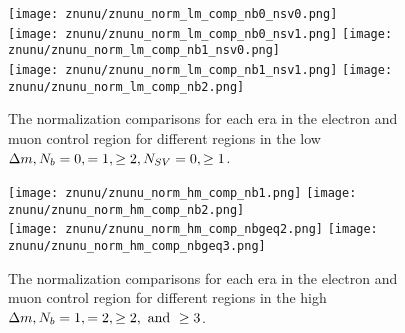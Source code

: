 \begin{figure}[!h]
	\begin{center}
  \texttt{[image: znunu/znunu\_norm\_lm\_comp\_nb0\_nsv0.png]} \\
  \texttt{[image: znunu/znunu\_norm\_lm\_comp\_nb0\_nsv1.png]} 
  \texttt{[image: znunu/znunu\_norm\_lm\_comp\_nb1\_nsv0.png]} \\
  \texttt{[image: znunu/znunu\_norm\_lm\_comp\_nb1\_nsv1.png]} 
  \texttt{[image: znunu/znunu\_norm\_lm\_comp\_nb2.png]} \\

	\end{center}
	\caption[\Znunu{} Normalization Low \dm{} Comparisons]{The \Znunu{} normalization comparisons for each era in the electron and muon control region for different regions in the low $\Delta m, N_{b}=0,=1,\geq2, N_{SV}=0,\geq1$.
	 }
	\label{fig:znunu-norm-lm-comp}
\end{figure}

\begin{figure}[!h]
	\begin{center}
  \texttt{[image: znunu/znunu\_norm\_hm\_comp\_nb1.png]}
  \texttt{[image: znunu/znunu\_norm\_hm\_comp\_nb2.png]} \\
  \texttt{[image: znunu/znunu\_norm\_hm\_comp\_nbgeq2.png]}
  \texttt{[image: znunu/znunu\_norm\_hm\_comp\_nbgeq3.png]} \\
	\end{center}
	\caption[\Znunu{} Normalization High \dm{} Comparisons]{The \Znunu{} normalization comparisons for each era in the electron and muon control region for different regions in the high $\Delta m, N_{b}=1,=2,\geq2, \text{ and } \geq3$.
	 }
	\label{fig:znunu-norm-hm-comp}
\end{figure}
